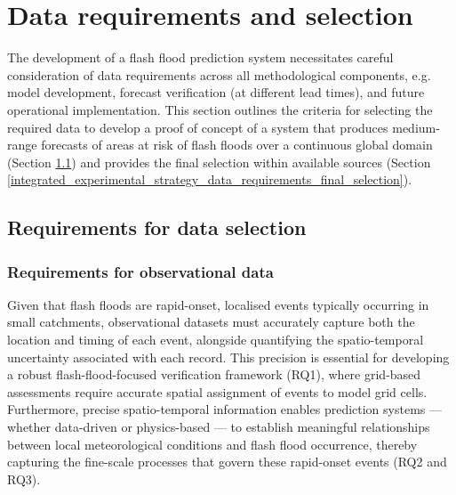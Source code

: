 \section{Data requirements and selection}
\label{integrated_experimental_strategy_data_requirements}

The development of a flash flood prediction system necessitates careful consideration of data requirements across all methodological components, e.g. model development, forecast verification (at different lead times), and future operational implementation. This section outlines the criteria for selecting the required data to develop a proof of concept of a system that produces medium-range forecasts of areas at risk of flash floods over a continuous global domain (Section \ref{integrated_experimental_strategy_data_requirements_selection_criteria}) and provides the final selection within available sources (Section \ref{integrated_experimental_strategy_data_requirements_final_selection}). 


\subsection{Requirements for data selection}
\label{integrated_experimental_strategy_data_requirements_selection_criteria}

\subsubsection{Requirements for observational data}

Given  that flash floods are rapid-onset, localised events typically occurring in small catchments, observational datasets must accurately capture both the location and timing of each event, alongside quantifying the spatio-temporal uncertainty associated with each record. This precision is essential for developing a robust flash-flood-focused verification framework (RQ1), where grid-based assessments require accurate spatial assignment of events to model grid cells. Furthermore, precise spatio-temporal information enables prediction systems — whether data-driven or physics-based — to establish meaningful relationships between local meteorological conditions and flash flood occurrence, thereby capturing the fine-scale processes that govern these rapid-onset events (RQ2 and RQ3).

